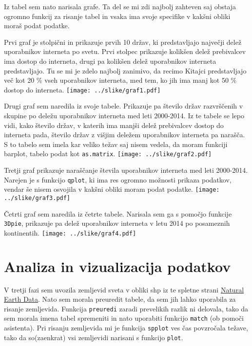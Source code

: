 \documentclass[11pt,a4paper]{article}
\begin{document}
Iz tabel sem nato narisala grafe. Ta del se mi zdi najbolj zahteven saj obstaja ogromno funkcij za risanje tabel in vsaka ima svoje specifike v kakšni obliki moraš podat podatke.

Prvi graf je stolpični in prikazuje prvih 10 držav, ki predstavljajo največji delež uporabnikov interneta po svetu. Prvi stolpec prikazuje kolikšen delež prebivalcev ima dostop do interneta, drugi pa kolikšen delež uporabnikov interneta predstavljajo. Tu se mi je zdelo najbolj zanimivo, da recimo Kitajci predstavljajo več kot 20 \% vseh uporabnikov interneta, med tem, ko jih ima manj kot 50 \% dostop do interneta.
\texttt{[image: ../slike/graf1.pdf]}

\newpage
Drugi graf sem naredila iz svoje tabele. Prikazuje pa število držav razvrščenih v skupine po deležu uporabnikov interneta med leti 2000-2014. Iz te tabele se lepo vidi, kako število držav, v katerih ima manjši delež prebivalcev dostop do interneta pada, število držav z višjim deležem uporabnikov interneta pa narašča.
S to tabelo sem imela kar veliko težav saj nisem vedela, da moram funkciji barplot, tabelo podat kot \verb|as.matrix|.
\-
\texttt{[image: ../slike/graf2.pdf]}

\newpage
Tretji graf prikazuje naraščanje števila uporabnikov interneta med leti 2000-2014. Narejen je s funkcijo \verb|qplot|, ki ima res ogromno možnosti prikaza podatkov, vendar še nisem osvojila v kakšni obliki moram podat podatke. 
\-
\texttt{[image: ../slike/graf3.pdf]}

Četrti graf sem naredila iz četrte tabele. Narisala sem ga s pomočjo funkcije \verb|3Dpie|, prikazuje pa delež uporabnikov interneta v letu 2014 po posameznih kontinentih.
\-
\texttt{[image: ../slike/graf4.pdf]}

\newpage


\section{Analiza in vizualizacija podatkov}
V tretji fazi sem uvozila zemljevid sveta v obliki shp iz te spletne strani \href{http://www.naturalearthdata.com/http//www.naturalearthdata.com/download/50m/cultural/ne_50m_admin_0_countries.zip}{Natural Earth Data}. Nato sem morala preuredit tabele, da sem jih lahko uporabila za risanje zemljevida. Funkcija \verb|preuredi| zaradi prevelikih razlik ni delovala, tako da sem morala imena tabel spremeniti in nato uporabiti funkcijo \verb|match| (ob pomoči asistenta). Pri risanju zemljevida mi je funkcija \verb|spplot| ves čas povzročala težave, tako da so(zaenkrat) vsi zemljevidi narisani s funkcijo \verb|plot|. 
\end{document}
